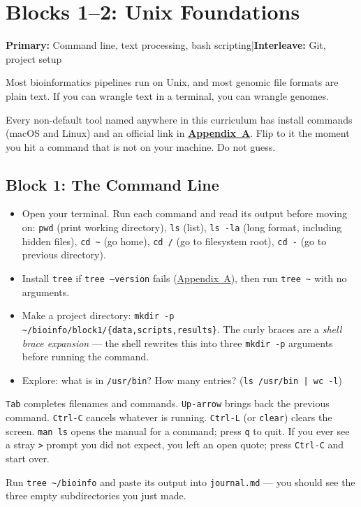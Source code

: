 \chapter{Blocks 1--2: Unix Foundations}\label{chap:unix}

\textbf{Primary:} Command line, text processing, bash scripting\quad|\quad\textbf{Interleave:} Git, project setup

\begin{brainbox}
Most bioinformatics pipelines run on Unix, and most genomic file formats are plain text. If you can wrangle text in a terminal, you can wrangle genomes.
\end{brainbox}

\begin{tipbox}
Every non-default tool named anywhere in this curriculum has install commands (macOS and Linux) and an official link in \textbf{\hyperref[app:tools]{Appendix~A}}. Flip to it the moment you hit a command that is not on your machine. Do not guess.
\end{tipbox}


\section{Block 1: The Command Line}

\begin{itemize}[nosep]
  \item Open your terminal. Run each command and read its output before moving on: \texttt{pwd} (print working directory), \texttt{ls} (list), \texttt{ls -la} (long format, including hidden files), \texttt{cd \textasciitilde} (go home), \texttt{cd /} (go to filesystem root), \texttt{cd -} (go to previous directory).
  \item Install \texttt{tree} if \texttt{tree --version} fails (\hyperref[app:tools]{Appendix~A}), then run \texttt{tree \textasciitilde} with no arguments.
  \item Make a project directory: \texttt{mkdir -p \textasciitilde/bioinfo/block1/\{data,scripts,results\}}. The curly braces are a \textit{shell brace expansion} --- the shell rewrites this into three \texttt{mkdir -p} arguments before running the command.
  \item Explore: what is in \texttt{/usr/bin}? How many entries? (\texttt{ls /usr/bin | wc -l})
\end{itemize}
\begin{tipbox}
\texttt{Tab} completes filenames and commands. \texttt{Up-arrow} brings back the previous command. \texttt{Ctrl-C} cancels whatever is running. \texttt{Ctrl-L} (or \texttt{clear}) clears the screen. \texttt{man ls} opens the manual for a command; press \texttt{q} to quit. If you ever see a stray \texttt{>} prompt you did not expect, you left an open quote; press \texttt{Ctrl-C} and start over.
\end{tipbox}
\begin{winbox}[Checkpoint]
Run \texttt{tree \textasciitilde/bioinfo} and paste its output into \texttt{journal.md} --- you should see the three empty subdirectories you just made.
\end{winbox}

